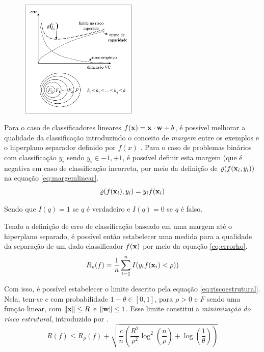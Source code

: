 \begin{figure}[h!]
  \centering
  \includegraphics[width=0.5\textwidth]{img/fig-minimizacao.png}
  \label{fig:minimizacao}
\end{figure}

Para o caso de classificadores lineares $f(\mathbf{x}) = \mathbf{x}\cdot\mathbf{w} + b$, é possível melhorar a qualidade da classifica\c{c}ão introduzindo o conceito de \emph{margem} entre os exemplos e o hiperplano separador definido por $f(x)$ \cite{smola2000advances}. Para o caso de problemas binários com classifica\c{c}ão $y_i$ sendo $y_i \in {-1, +1}$, é possível definir esta margem (que é negativa em caso de classifica\c{c}ão incorreta, por meio da defini\c{c}ão de $\varrho(f(\mathbf{x}_i,y_i))$ na equa\c{c}ão \ref{eq:margemlinear}.
\begin{equation}\label{eq:margemlinear}
  \varrho(f(\mathbf{x}_i),y_i) = y_i f(\mathbf{x}_i)
\end{equation}

Sendo que $I(q) = 1$ se $q$ é verdadeiro e $I(q) = 0$ se $q$ é falso.

Tendo a defini\c{c}ão de erro de classifica\c{c}ão baseado em uma margem até o hiperplano separado, é possível então estabelecer uma medida para a qualidade da separa\c{c}ão de um dado classificador $f(\mathbf{x})$ por meio da equa\c{c}ão \ref{eq:errorho}.
\begin{equation}\label{eq:errorho}
  R_\rho(f) = \frac{1}{n}\sum^{n}_{i=1}{I(y_i f(\mathbf{x}_i) < \rho))}
\end{equation}

Com isso, é possível estabelecer o limite descrito pela equa\c{c}ão \ref{eq:riscoestrutural}. Nela, tem-se $c$ com probabilidade $1 - \theta \in [0,1]$, para $\rho > 0$ e $F$ sendo uma fun\c{c}ão linear, com $\lVert \mathbf{x} \rVert \le R$ e $\lVert \mathbf{w} \rVert \le 1$. Esse limite constitui a \emph{minimiza\c{c}ão do risco estrutural}, introduzido por \cite{vapnik1998statistical}.
\begin{equation}\label{eq:riscoestrutural}
  R(f) \leqslant R_\rho(f) + \sqrt{
        \frac{c}{n}
        \left(
          \frac{R^2}{\rho^2}
          \log^2\left(\frac{n}{\rho}\right) +
          \log\left(\frac{1}{\theta}\right) \right)
       }%
\end{equation}

